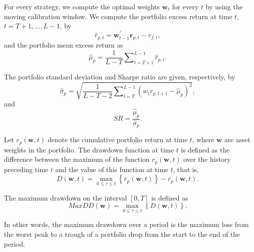 \documentclass[a4paper,10pt]{article}
\begin{document}
For every strategy, we compute the optimal weights $\mathbf{w}_{t}$ for every $t$ by using the moving calibration window. We compute the portfolio excess return at time $t$, $t=T+1,\ldots,L-1$, by
\begin{equation}
\widehat{r}_{p,t}=\mathbf{w}_{t-1}^{^{\top }}\mathbf{r}_{p,t}-r_{f,t},
\end{equation}
and the portfolio mean excess return as
\begin{equation}
\widehat{\mu }_{p}=\frac{1}{L-T}\sum\nolimits_{t=T+1}^{L-1}\widehat{r}_{p,t}.
\end{equation}

The portfolio standard deviation and Sharpe ratio are given, respectively, by
\begin{equation}
\widehat{\sigma }_{p}=\sqrt{\frac{1}{L-T-2}\sum\nolimits_{t=T}^{L-1}\left(w_{t}r_{p,t+1}-\widehat{\mu }_{p}\right)^{2}},
\end{equation}
and
\begin{equation}
SR=\frac{\widehat{\mu }_{p}}{\widehat{\sigma }_{p}}.
\end{equation}

Let $r_{p}\left( \mathbf{w,}t\right) $ denote the cumulative portfolio return at time $t$, where $\mathbf{w}$ are asset weights in the portfolio. The drawdown function at time $t$ \citep*{unger2014} is defined as the difference between the maximum of the function $r_{p}\left( \mathbf{w,} t\right) $ over the history preceding time $t$ and the value of this function at time $t$, that is,
\begin{equation}
D\left( \mathbf{w,}t\right) =\underset{0\leq \tau \leq t}{\max }\left\{
r_{p}\left( \mathbf{w,}t\right) \right\} -r_{p}\left( \mathbf{w,}t\right) .
\end{equation}%

The maximum drawdown on the interval $[0,T]$ is defined as
\begin{equation}
MaxDD\left( \mathbf{w}\right) =\underset{0\leq \tau \leq t}{\max }\left\{D\left( \mathbf{w,}t\right) \right\} .
\end{equation}

In other words, the maximum drawdown over a period is the maximum loss from the worst peak to a trough of a portfolio drop from the start to the end of the period.
\end{document}
